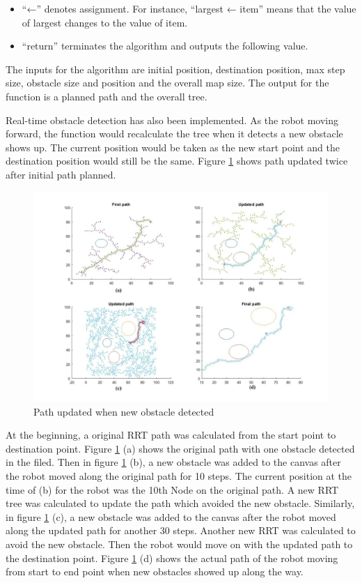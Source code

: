 \documentclass[
  oneside]{ubcthesis}
\providecommand{\tightlist}{%
  \setlength{\itemsep}{0pt}\setlength{\parskip}{0pt}}
\begin{document}
\begin{itemize}
\tightlist
\item
  ``←'' denotes assignment. For instance, ``largest ← item'' means that the value of largest changes to the value of item.
\item
  ``return'' terminates the algorithm and outputs the following value.
\end{itemize}

The inputs for the algorithm are initial position, destination position, max step size, obstacle size and position and the overall map size. The output for the function is a planned path and the overall tree.

Real-time obstacle detection has also been implemented. As the robot moving forward, the function would recalculate the tree when it detects a new obstacle shows up. The current position would be taken as the new start point and the destination position would still be the same. Figure \ref{fig:figure2} shows path updated twice after initial path planned.

\begin{figure}

{\centering \includegraphics[width=0.9\linewidth]{figures/2-1} 

}

\caption{Path updated when new obstacle detected}\label{fig:figure2}
\end{figure}



At the beginning, a original RRT path was calculated from the start point to destination point. Figure \ref{fig:figure2} (a) shows the original path with one obstacle detected in the filed. Then in figure \ref{fig:figure2} (b), a new obstacle was added to the canvas after the robot moved along the original path for 10 steps. The current position at the time of (b) for the robot was the 10th Node on the original path. A new RRT tree was calculated to update the path which avoided the new obstacle. Similarly, in figure \ref{fig:figure2} (c), a new obstacle was added to the canvas after the robot moved along the updated path for another 30 steps. Another new RRT was calculated to avoid the new obstacle. Then the robot would move on with the updated path to the destination point. Figure \ref{fig:figure2} (d) shows the actual path of the robot moving from start to end point when new obstacles showed up along the way.
\end{document}

